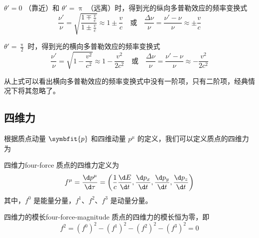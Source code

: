 $\theta' = 0$ （靠近）和 $\theta' = \uppi$ （远离）时，得到光的纵向多普勒效应的频率变换式
\begin{equation}
    \frac{\nu'}{\nu} = \sqrt{\frac{1 \mp \frac{v}{c}}{1 \pm \frac{v}{c}}} \approx 1 \pm \frac{v}{c} \quad \text{或} \quad \frac{\Delta \nu}{\nu} = \frac{\nu' - \nu}{\nu} \approx \pm \frac{v}{c}
\end{equation}

$\theta' = \frac{\uppi}{2}$ 时，得到光的横向多普勒效应的频率变换式
\begin{equation}
    \frac{\nu'}{\nu} = \sqrt{1 - \frac{v^2}{c^2}} \approx 1 - \frac{v^2}{2 c^2} \quad \text{或} \quad \frac{\Delta \nu}{\nu} = \frac{\nu' - \nu}{\nu} \approx -\frac{v^2}{2 c^2}
\end{equation}

从上式可以看出横向多普勒效应的频率变换式中没有一阶项，只有二阶项，经典情况下将其忽略了。

\subsection{四维力}
根据质点动量 $\symbfit{p}$ 和四维动量 $p^\mu$ 的定义，我们可以定义质点的四维力为
\begin{definition}{四维力}{four-force}
    质点的四维力定义为
    \begin{equation}
        f^\mu = \frac{\d p^\mu}{\d \tau} = \left( \frac{1}{c} \frac{\d E}{\d t}, \frac{\d p_x}{\d t}, \frac{\d p_y}{\d t}, \frac{\d p_z}{\d t} \right)
    \end{equation}
    其中，$f^0$ 是能量分量，$f^1$、$f^2$、$f^3$ 是动量分量。
\end{definition}

\begin{theorem}{四维力的模长}{four-force-magnitude}
    质点的四维力的模长恒为零，即
    \begin{equation}
        f^2 = (f^0)^2 - (f^1)^2 - (f^2)^2 - (f^3)^2 = 0
    \end{equation}
\end{theorem}

